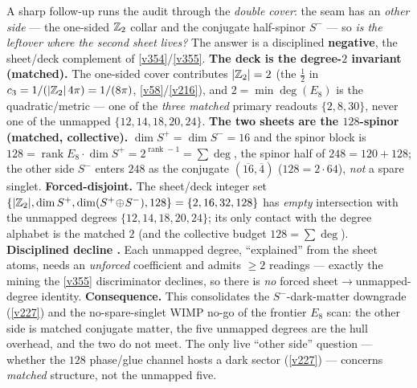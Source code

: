 \begin{winbox}
A sharp follow-up runs the audit through the \emph{double cover}: the seam has an \emph{other side} --- the one-sided $\mathbb{Z}_2$ collar and the conjugate half-spinor $S^-$ --- so \emph{is the leftover where the second sheet lives?} The answer is a disciplined \textbf{negative}, the sheet/deck complement of \vref{v354}/\vref{v355}. \textbf{The deck is the degree-$2$ invariant (matched).} The one-sided cover contributes $|\mathbb{Z}_2|=2$ (the $\tfrac12$ in $c_3=1/(|\mathbb{Z}_2|\,4\pi)=1/(8\pi)$, \vref{v58}/\vref{v216}), and $2=\min\deg(E_8)$ is the quadratic/metric --- one of the \emph{three matched} primary readouts $\{2,8,30\}$, never one of the unmapped $\{12,14,18,20,24\}$. \textbf{The two sheets are the $128$-spinor (matched, collective).} $\dim S^+=\dim S^-=16$ and the spinor block is $128=\operatorname{rank}E_8\cdot\dim S^+=2^{\operatorname{rank}-1}=\sum\deg$, the spinor half of $248=120+128$; the other side $S^-$ enters $248$ as the conjugate $(\overline{16},\overline4)$ ($128=2\cdot64$), \emph{not} a spare singlet. \textbf{Forced-disjoint.} The sheet/deck integer set $\{|\mathbb{Z}_2|,\dim S^+,\dim(S^+\!\oplus\!S^-),128\}=\{2,16,32,128\}$ has \emph{empty} intersection with the unmapped degrees $\{12,14,18,20,24\}$; its only contact with the degree alphabet is the matched $2$ (and the collective budget $128=\sum\deg$). \textbf{Disciplined decline \mO.} Each unmapped degree, ``explained'' from the sheet atoms, needs an \emph{unforced} coefficient and admits $\ge2$ readings --- exactly the mining the \vref{v355} discriminator declines, so there is \emph{no} forced sheet$\to$unmapped-degree identity. \textbf{Consequence.} This consolidates the $S^-$-dark-matter downgrade (\vref{v227}) and the no-spare-singlet WIMP no-go of the frontier $E_8$ scan: the other side is matched conjugate matter, the five unmapped degrees are the hull overhead, and the two do not meet. The only live ``other side'' question --- whether the $128$ phase/glue channel hosts a dark sector (\vref{v227}) --- concerns \emph{matched} structure, not the unmapped five.
\end{winbox}

